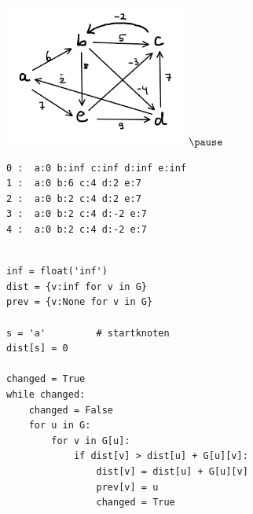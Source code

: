 \begin{frame}[fragile]
\includegraphics[width=6cm]{bellman_04.png} $\pause$

\begin{lstlisting}[basicstyle=\scriptsize]
0 :  a:0 b:inf c:inf d:inf e:inf
1 :  a:0 b:6 c:4 d:2 e:7
2 :  a:0 b:2 c:4 d:2 e:7
3 :  a:0 b:2 c:4 d:-2 e:7
4 :  a:0 b:2 c:4 d:-2 e:7
\end{lstlisting} \pause
\end{frame}

\begin{frame}[fragile]
\begin{lstlisting}[basicstyle=\scriptsize]

inf = float('inf')
dist = {v:inf for v in G}
prev = {v:None for v in G}

s = 'a'         # startknoten
dist[s] = 0

changed = True
while changed:
    changed = False
    for u in G:    
        for v in G[u]:
            if dist[v] > dist[u] + G[u][v]:
                dist[v] = dist[u] + G[u][v]
                prev[v] = u
                changed = True

\end{lstlisting}
\end{frame}

